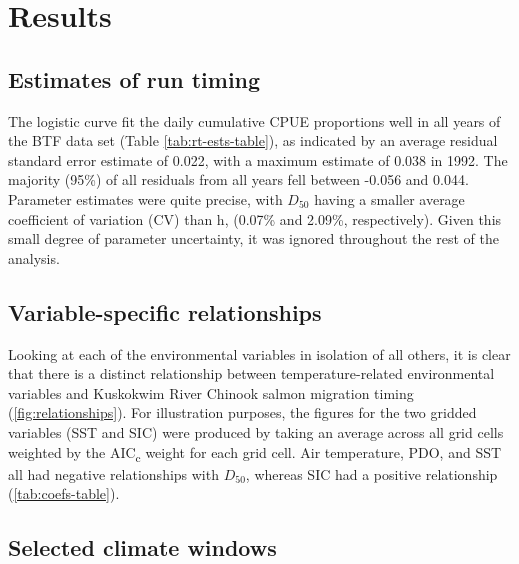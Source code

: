 \documentclass[12pt,]{book}
\theoremstyle{definition}
\theoremstyle{definition}
\theoremstyle{definition}
\theoremstyle{remark}
\begin{document}
\section{Results}\label{results}

\subsection{Estimates of run timing}\label{estimates-of-run-timing}

\noindent
The logistic curve fit the daily cumulative CPUE proportions well in all
years of the BTF data set (Table \ref{tab:rt-ests-table}), as indicated
by an average residual standard error estimate of 0.022, with a maximum
estimate of 0.038 in 1992. The majority (95\%) of all residuals from all
years fell between -0.056 and 0.044. Parameter estimates were quite
precise, with \(D_50\) having a smaller average coefficient of variation
(CV) than h, (0.07\% and 2.09\%, respectively). Given this small degree
of parameter uncertainty, it was ignored throughout the rest of the
analysis.

\subsection{Variable-specific
relationships}\label{variable-specific-relationships}

\noindent
Looking at each of the environmental variables in isolation of all
others, it is clear that there is a distinct relationship between
temperature-related environmental variables and Kuskokwim River Chinook
salmon migration timing (\ref{fig:relationships}). For illustration
purposes, the figures for the two gridded variables (SST and SIC) were
produced by taking an average across all grid cells weighted by the
AIC\textsubscript{c} weight for each grid cell. Air temperature, PDO,
and SST all had negative relationships with \(D_{50}\), whereas SIC had
a positive relationship (\ref{tab:coefs-table}).

\subsection{Selected climate windows}\label{selected-climate-windows}
\end{document}
